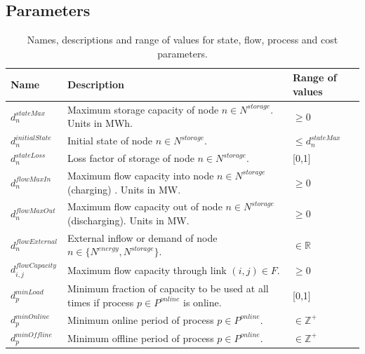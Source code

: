 \documentclass{article}
\begin{document}
\subsection{Parameters}
\begin{table}[H]
\small
\caption{Names, descriptions and range of values for state, flow, process and cost parameters.}
\label{tbl:parameters}
\centering
\begin{tabular}{ l |p{8cm}|l  }

Name     & Description   & Range of values \\
\midrule

$d^{stateMax}_n$  & Maximum storage capacity of node $n \in N^{storage}$. Units in MWh. & $\geq 0$ \\

$d^{initialState}_n$ & Initial state of node $n \in N^{storage}$. & $\leq d^{stateMax}_n$ \\

$d^{stateLoss}_n$ & Loss factor of storage of node $n \in N^{storage}$. & [0,1] \\

$d^{flowMaxIn}_n$ & Maximum flow capacity into node $n \in N^{storage}$ (charging) . Units in MW. &  $\geq  0$  \\

$d^{flowMaxOut}_n$ & Maximum flow capacity out of node $n \in N^{storage}$ (discharging). Units in MW. & $\geq  0$ \\

$d^{flowExternal}_n$ & External inflow or demand of node $n \in \{N^{energy}, N^{storage}\}$. & $\in \mathbb{R}$ \\

$d^{flowCapacity}_{i,j}$ & Maximum flow capacity through link $(i, j) \in F$. &  $\geq  0$\\

$d^{minLoad}_{p}$  & Minimum fraction of capacity to be used at all times if process $p \in P^{online}$ is online. & [0,1]  \\

$d^{minOnline}_p$ & Minimum online period of process $p \in P^{online}$. & $\in \mathbb{Z}^+$\\

$d^{minOffline}_p$ & Minimum offline period of process $p \in P^{online}$. & $\in \mathbb{Z}^+$ \\


\end{tabular}
\end{table}
\end{document}
